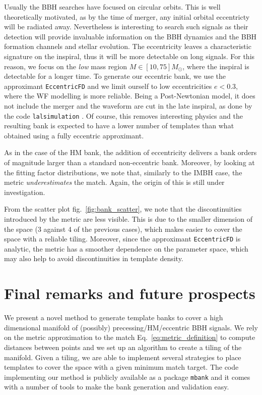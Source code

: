 \documentclass[twocolumn,showpacs,preprintnumbers,nofootinbib,prd,
superscriptaddress,10pt]{revtex4-2}
\begin{document}
Usually the BBH searches have focused on circular orbits.
This is well theoretically motivated, as by the time of merger, any initial orbital eccentricty will be radiated away. Nevertheless is interesting to search such signals as their detection will provide invaluable information on the BBH dynamics and the BBH formation channels and stellar evolution.
The eccentricity leaves a characteristic signature on the inspiral, thus it will be more detectable on long signals. For this reason, we focus on the {\it low} mass region $M\in [10,75] M_\odot$, where the inspiral is detectable for a longer time.
To generate our eccentric bank, we use the approximant \texttt{EccentricFD} \cite{PhysRevD.93.124061} and we limit ourself to low eccentricities $e<0.3$, where the WF modelling is more reliable. Being a Post-Newtonian model, it does not include the merger and the waveform are cut in the late inspiral, as done by the code \texttt{lalsimulation} \cite{lalsuite}. Of course, this removes interesting physics and the resulting bank is expected to have a lower number of templates than what obtained using a fully eccentric approximant.

As in the case of the HM bank, the addition of eccentricity delivers a bank orders of magnitude larger than a standard non-eccentric bank.
Moreover, by looking at the fitting factor distributions, we note that, similarly to the IMBH case, the metric {\it underestimates} the match. Again, the origin of this is still under investigation.

From the scatter plot fig.~\ref{fig:bank_scatter}, we note that the discontinuities introduced by the metric are less visible. This is due to the smaller dimension of the space (3 against 4 of the previous cases), which makes easier to cover the space with a reliable tiling. Moreover, since the approximant \texttt{EccentricFD} is analytic, the metric has a smoother dependence on the parameter space, which may also help to avoid discontinuities in template density.

\section{Final remarks and future prospects} \label{sec:conclusion}

We present a novel method to generate template banks to cover a high dimensional manifold of (possibly) precessing/HM/eccentric BBH signals.
We rely on the metric approximation to the match Eq.~\eqref{eq:metric_definition} to compute distances between points and we set up an algorithm to create a tiling of the manifold. Given a tiling, we are able to implement several strategies to place templates to cover the space with a given minimum match target.
The code implementing our method is publicly available as a package \texttt{mbank} and it comes with a number of tools to make the bank generation and validation easy.
\end{document}
